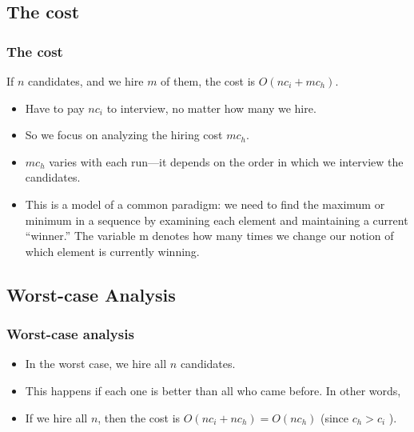 \documentclass[notes,serif]{beamer}
\begin{document}
\subsection{The cost}
\begin{frame}
  \frametitle{The cost}
  If $n$ candidates, and we hire $m$ of them, the cost is $O(nc_i + mc_h)$.
  \begin{itemize}
    \item Have to pay $nc_i$ to interview, no matter how many we hire.
    \item So we focus on analyzing the hiring cost $mc_h$.
    \item $mc_h$ varies with each run---it depends on the order in which we interview the candidates.
    \item This is a model of a common paradigm: we need to find the maximum or minimum in a sequence by examining each element and maintaining a current ``winner.'' The variable m denotes how many times we change our notion of which element is currently winning.
  \end{itemize}
\end{frame}

\subsection{Worst-case Analysis}
\begin{frame}
\frametitle{Worst-case analysis}
  \begin{itemize}
    \item In the worst case, we hire all $n$ candidates.
    \item This happens if each one is better than all who came before.  In other words, \pause {}
    \pause
    \item If we hire all $n$, then the cost is $O(nc_i + nc_h) = O(nc_h)$ (since $c_h > c_i$ ).
  \end{itemize}
\end{frame}
\end{document}
